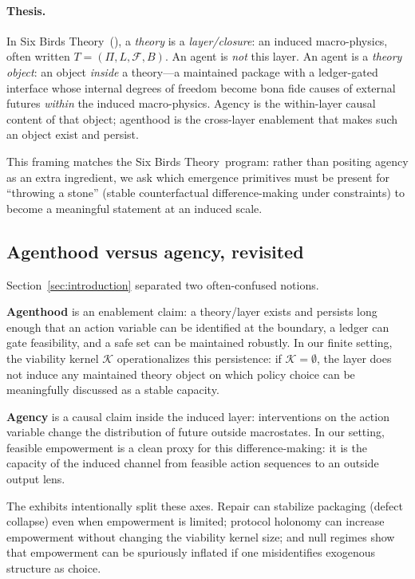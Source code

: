 \documentclass[11pt]{article}
\newcommand{\SBT}{Six Birds Theory}
\newcommand{\K}{\mathcal{K}}
\begin{document}
\paragraph{Thesis.}
In \SBT\ (\citep{six_birds_theory}), a \emph{theory} is a \emph{layer/closure}: an induced macro-physics, often written $T=(\Pi,L,\mathcal F,B)$. An agent is \emph{not} this layer. An agent is a \emph{theory object}: an object \emph{inside} a theory---a maintained package with a ledger-gated interface whose internal degrees of freedom become bona fide causes of external futures \emph{within} the induced macro-physics. Agency is the within-layer causal content of that object; agenthood is the cross-layer enablement that makes such an object exist and persist.

This framing matches the \SBT\ program: rather than positing agency as an extra ingredient, we ask which emergence primitives must be present for ``throwing a stone'' (stable counterfactual difference-making under constraints) to become a meaningful statement at an induced scale.

\subsection{Agenthood versus agency, revisited}
Section~\ref{sec:introduction} separated two often-confused notions.

\textbf{Agenthood} is an enablement claim: a theory/layer exists and persists long enough that an action variable can be identified at the boundary, a ledger can gate feasibility, and a safe set can be maintained robustly. In our finite setting, the viability kernel $\K$ operationalizes this persistence: if $\K=\emptyset$, the layer does not induce any maintained theory object on which policy choice can be meaningfully discussed as a stable capacity.

\textbf{Agency} is a causal claim inside the induced layer: interventions on the action variable change the distribution of future outside macrostates. In our setting, feasible empowerment is a clean proxy for this difference-making: it is the capacity of the induced channel from feasible action sequences to an outside output lens.

The exhibits intentionally split these axes. Repair can stabilize packaging (defect collapse) even when empowerment is limited; protocol holonomy can increase empowerment without changing the viability kernel size; and null regimes show that empowerment can be spuriously inflated if one misidentifies exogenous structure as choice.
\end{document}
